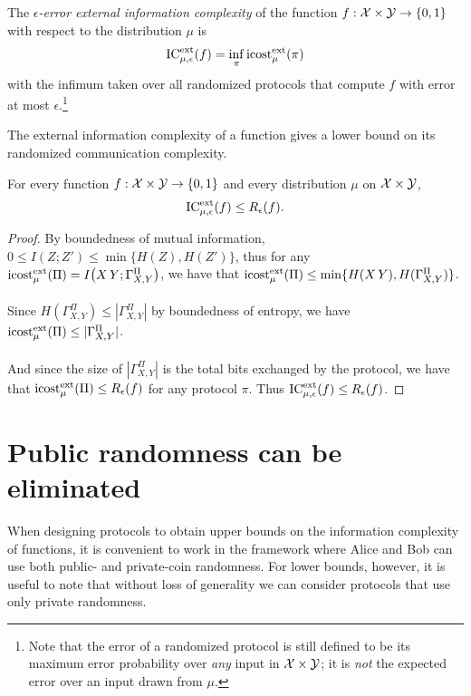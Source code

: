 \begin{definition}
	The \emph{$\epsilon$-error external information complexity} of the function $f : \mathcal{X} \times \mathcal{Y} \to \{0,1\}$ with respect to the distribution $\mu$ is
	\[
	\mathrm{IC}^{\mathrm{ext}}_{\mu,\epsilon}(f) = \inf_{\pi} \mathrm{icost}^{\mathrm{ext}}_\mu(\pi)
	\]
	with the infimum taken over all randomized protocols that compute $f$ with error at most $\epsilon$.\footnote{Note that the error of a randomized protocol is still defined to be its maximum error probability over \emph{any} input in $\mathcal{X} \times \mathcal{Y}$; it is \emph{not} the expected error over an input drawn from $\mu$.}
\end{definition}

The external information complexity of a function gives a lower bound on its randomized communication complexity.

\begin{theorem}
	For every function $f : \mathcal{X} \times \mathcal{Y} \to \{0,1\}$ and every distribution $\mu$ on $\mathcal{X} \times \mathcal{Y}$,
	\[
	\mathrm{IC}^{\mathrm{ext}}_{\mu,\epsilon}(f) \le R_\epsilon(f).
	\]
\end{theorem}

\begin{proof}
	By boundedness of mutual information, $0 \le I(Z ; Z') \le \min\{ H(Z), H(Z') \}$, thus for any $\mathrm{icost}^{\mathrm{ext}}_\mu(\Pi) = I\big( X\,Y ; \Gamma_{X,Y}^\Pi \big)$, we have that $\mathrm{icost}^{\mathrm{ext}}_\mu(\Pi) \leq \min\{ H(X\,Y), H(\Gamma_{X,Y}^\Pi) \}$.\\
	\\
	Since $H(\Gamma_{X,Y}^\Pi) \leq |\Gamma_{X,Y}^\Pi|$ by boundedness of entropy, we have $\mathrm{icost}^{\mathrm{ext}}_\mu(\Pi) \leq |\Gamma_{X,Y}^\Pi|$.\\
	\\
	And since the size of $|\Gamma_{X,Y}^\Pi|$ is the total bits exchanged by the protocol, we have that $\mathrm{icost}^{\mathrm{ext}}_\mu(\Pi) \leq R_\epsilon(f)$ for any protocol $\pi$. Thus $\mathrm{IC}^{\mathrm{ext}}_{\mu,\epsilon}(f) \le R_\epsilon(f)$.
\end{proof}



\section{Public randomness can be eliminated}

When designing protocols to obtain upper bounds on the information complexity of functions, it is convenient to work in the framework where Alice and Bob can use both public- and private-coin randomness. For lower bounds, however, it is useful to note that without loss of generality we can consider protocols that use only private randomness.

